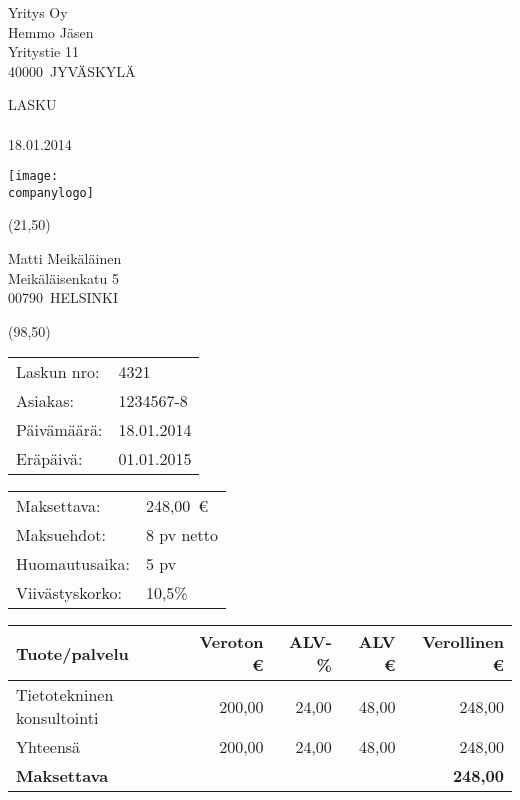 \documentclass[a4paper]{article}
\newcommand{\theinvoice}{Lasku}
\newcommand{\thecomplaints}{Huomautusaika}
\newcommand{\theterms}{Maksuehdot}
\newcommand{\theinterest}{Viivästyskorko}
\newcommand{\thepayerid}{Asiakas}
\newcommand{\theservice}{Tuote/palvelu}
\newcommand{\theexcleur}{Veroton \euro}
\newcommand{\thevatpercent}{ALV-\%}
\newcommand{\thevateur}{ALV \euro}
\newcommand{\theincleur}{Verollinen \euro}
\newcommand{\thetotal}{Yhteensä}
\newcommand{\thepayable}{Maksettava}
\newcommand{\thedate}{Päivämäärä}
\newcommand{\theduedateup}{Eräpäivä} %
\newcommand{\thepaymentsum}{Maksettava}
\newcommand{\theinvoicenumberup}{Laskun nro} %
\newcommand{\theinvoice}{Invoice}
\newcommand{\thecomplaints}{Period for complaints}
\newcommand{\theterms}{Terms of payment}
\newcommand{\theinterest}{Interest on arrears}
\newcommand{\thepayerid}{Customer}
\newcommand{\theservice}{Product/service}
\newcommand{\theexcleur}{Price \euro}
\newcommand{\thevatpercent}{VAT \%}
\newcommand{\thevateur}{VAT \euro}
\newcommand{\theincleur}{Total price \euro}
\newcommand{\thetotal}{Total}
\newcommand{\thepayable}{Invoice total}
\newcommand{\thedate}{Invoice date}
\newcommand{\theduedateup}{Due date} %
\newcommand{\thepaymentsum}{Invoice total}
\newcommand{\theinvoicenumberup}{Invoice No.} %
\newcommand{\companyname}{Yritys Oy}
\newcommand{\companylogo}{pics/logo.pdf}
\newcommand{\companyperson}{Hemmo Jäsen}
\newcommand{\companyaddress}{Yritystie 11}
\newcommand{\companyzip}{40000}
\newcommand{\companycity}{Jyväskylä}
\newcommand{\payername}{Matti Meikäläinen}
\newcommand{\payeraddress}{Meikäläisenkatu 5}
\newcommand{\payerzip}{00790}
\newcommand{\payercity}{Helsinki}
\newcommand{\payerid}{1234567-8}
\newcommand{\invoicedate}{18.01.2014}
\newcommand{\duedate}{01.01.2015}
\newcommand{\invoicenumber}{4321}
\newcommand{\complaints}{5 pv}
\newcommand{\terms}{8 pv netto}
\newcommand{\interest}{10,5\%}
\newcommand{\paymentsum}{248,00}
\begin{document}
\begin{center}\begin{minipage}[t][175mm][t]{168mm}

\fontsize{12pt}{13pt}\selectfont

\parbox[b][30mm][t]{50mm}{\raggedright \companyname\\ \companyperson\\ \companyaddress\\ \companyzip\ \MakeUppercase{\companycity}}
\hspace{28mm}\parbox[b][30mm][t]{50mm}{\raggedright \MakeUppercase{\theinvoice}\\ \mbox{} \\ \invoicedate}
\hfill\parbox[b][30mm][t]{14.5mm}{\texttt{[image: \\companylogo]}}

\begin{textblock}{90}(21,50)
\parbox[t][50mm][t]{90mm}{\raggedright
\payername\\
\payeraddress\\
\payerzip\ \MakeUppercase{\payercity}
}
\end{textblock}

\fontsize{9pt}{12pt}\selectfont
\begin{textblock}{90}(98,50)
\parbox[t][50mm][t]{40mm}{
\begin{tabular}{l l}
\theinvoicenumberup: & \invoicenumber\\
\thepayerid: & \payerid\\
\thedate: & \invoicedate\\
\theduedateup: & \duedate
\end{tabular}
}
\hfill
\parbox[t][50mm][t]{40mm}{
\begin{tabular}{l l}
\thepaymentsum: & \paymentsum\ \euro\\
\theterms: & \terms\\
\thecomplaints: & \complaints\\
\theinterest: & \interest
\end{tabular}
}
\end{textblock}


\vspace{35mm}

\fontsize{12pt}{13pt}\selectfont
\renewcommand{\arraystretch}{2.0}

\begin{center}
\begin{tabular}{l r r r r}
\theservice \hspace{58mm} & \theexcleur & \thevatpercent & \thevateur & \theincleur \\
\hline
Tietotekninen konsultointi & 200,00 & 24,00 & 48,00 & 248,00 \\
\hline
\thetotal & 200,00 & 24,00 & 48,00 & 248,00 \\
\textbf{\thepayable} & & & & \textbf{248,00}
\end{tabular}
\end{center}



\end{minipage}
\end{center}
\end{document}
